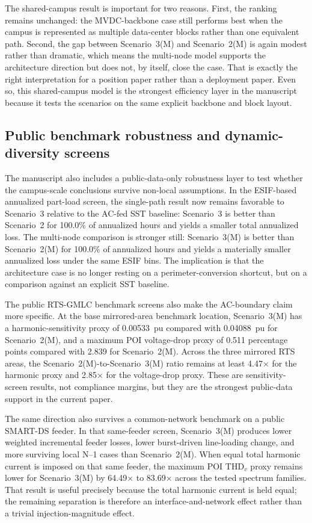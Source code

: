 \documentclass[11pt]{article}
\begin{document}
The shared-campus result is important for two reasons. First, the ranking remains unchanged: the MVDC-backbone case still performs best when the campus is represented as multiple data-center blocks rather than one equivalent path. Second, the gap between Scenario~3(M) and Scenario~2(M) is again modest rather than dramatic, which means the multi-node model supports the architecture direction but does not, by itself, close the case. That is exactly the right interpretation for a position paper rather than a deployment paper. Even so, this shared-campus model is the strongest efficiency layer in the manuscript because it tests the scenarios on the same explicit backbone and block layout.

\subsection{Public benchmark robustness and dynamic-diversity screens}
The manuscript also includes a public-data-only robustness layer to test whether the campus-scale conclusions survive non-local assumptions. In the ESIF-based annualized part-load screen, the single-path result now remains favorable to Scenario~3 relative to the AC-fed SST baseline: Scenario~3 is better than Scenario~2 for 100.0\% of annualized hours and yields a smaller total annualized loss. The multi-node comparison is stronger still: Scenario~3(M) is better than Scenario~2(M) for 100.0\% of annualized hours and yields a materially smaller annualized loss under the same ESIF bins. The implication is that the architecture case is no longer resting on a perimeter-conversion shortcut, but on a comparison against an explicit SST baseline.

The public RTS-GMLC benchmark screens also make the AC-boundary claim more specific. At the base mirrored-area benchmark location, Scenario~3(M) has a harmonic-sensitivity proxy of 0.00533~pu compared with 0.04088~pu for Scenario~2(M), and a maximum POI voltage-drop proxy of 0.511 percentage points compared with 2.839 for Scenario~2(M). Across the three mirrored RTS areas, the Scenario~2(M)-to-Scenario~3(M) ratio remains at least 4.47$\times$ for the harmonic proxy and 2.85$\times$ for the voltage-drop proxy. These are sensitivity-screen results, not compliance margins, but they are the strongest public-data support in the current paper.

The same direction also survives a common-network benchmark on a public SMART-DS feeder. In that same-feeder screen, Scenario~3(M) produces lower weighted incremental feeder losses, lower burst-driven line-loading change, and more surviving local N--1 cases than Scenario~2(M). When equal total harmonic current is imposed on that same feeder, the maximum POI THD$_v$ proxy remains lower for Scenario~3(M) by 64.49$\times$ to 83.69$\times$ across the tested spectrum families. That result is useful precisely because the total harmonic current is held equal; the remaining separation is therefore an interface-and-network effect rather than a trivial injection-magnitude effect.
\end{document}
